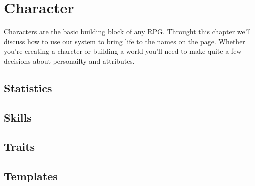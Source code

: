 
\chapter{Character}
Characters are the basic building block of any \gls{RPG}.  Throught this
chapter we'll discuss how to use our system to bring life to the names
on the page.  Whether you're creating a charcter or building a world
you'll need to make quite a few decisions about personailty and
attributes.

\section{Statistics}


\section{Skills}


\section{Traits}


\section{Templates}

